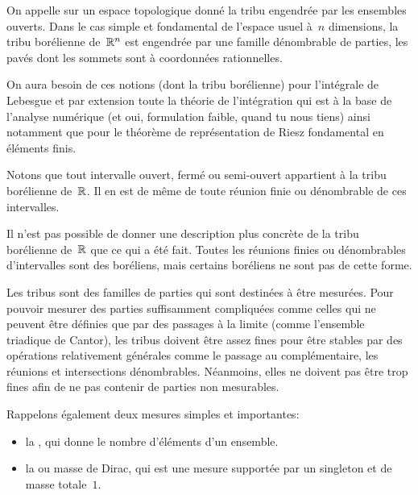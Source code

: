 \begin{definition}
On appelle  sur un espace topologique donné la tribu engendrée par les ensembles ouverts.
Dans le cas simple et fondamental de l'espace usuel à~$n$ dimensions, la tribu borélienne de~$\mathbb R^n$ est engendrée par une famille dénombrable de parties, les pavés dont les sommets sont à coordonnées rationnelles.
\end{definition}

On aura besoin de ces notions (dont la tribu borélienne) pour l'intégrale de Lebesgue et par extension toute la théorie de l'intégration qui est à la base de l'analyse numérique (et oui, formulation faible, quand tu nous tiens) ainsi notamment que pour le théorème de représentation de Riesz fondamental en éléments finis.

\medskip
Notons que tout intervalle ouvert, fermé ou semi-ouvert appartient à la tribu borélienne de~$\mathbb R$.
Il en est de même de toute réunion finie ou dénombrable de ces intervalles.

\medskip
Il n'est pas possible de donner une description plus concrète de la tribu borélienne de~$\mathbb R$ que ce qui a été fait. Toutes les réunions finies ou dénombrables d'intervalles sont des boréliens, mais certains boréliens ne sont pas de cette forme. 

\medskip
Les tribus sont des familles de parties qui sont destinées à être mesurées. Pour pouvoir mesurer des parties suffisamment compliquées comme celles qui ne peuvent être définies que par des passages à la limite (comme l'ensemble triadique de Cantor), les tribus doivent être assez fines pour être stables par des opérations relativement générales comme le passage au complémentaire, les réunions et intersections dénombrables. Néanmoins, elles ne doivent pas être trop fines afin de ne pas contenir de parties non mesurables.

\medskip
Rappelons également deux mesures simples et importantes:
\begin{itemize}
  \item la , qui donne le nombre d'éléments d'un ensemble.
  \item la  ou masse de Dirac, qui est une mesure supportée par un singleton et de masse totale~$1$.
\end{itemize}

